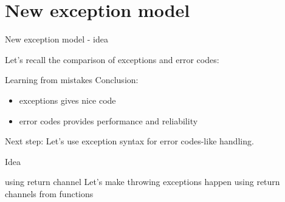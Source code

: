 \documentclass[10pt,a4paper]{beamer}
\begin{document}
\section{New exception model}
\begin{frame}{New exception model - idea}
	\begin{center}
		Let's recall the comparison of exceptions and error codes:
	\end{center}
	
	\begin{figure}
	\end{figure}
	
\end{frame}

\begin{frame}{Learning from mistakes}
	\centering
	Conclusion:
	
	\begin{itemize}
		\item exceptions gives nice code
		\item error codes provides performance and reliability
	\end{itemize}

	\begin{alertblock}{Next step:}
	Let's use exception syntax for error codes-like handling.
	\end{alertblock}
	
\end{frame}

\begin{frame}{Idea}

	\begin{alertblock}{using return channel}
		Let's make throwing exceptions happen using return channels from functions
	\end{alertblock}
\end{frame}
\end{document}
